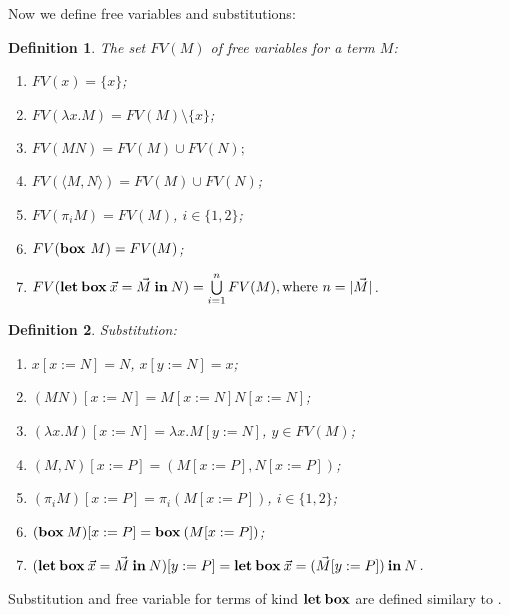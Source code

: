 \documentclass[a4paper]{article}
\newtheorem{defin}{Definition}
\begin{document}
  Now we define free variables and substitutions:

  \begin{defin} The set $FV(M)$ of free variables for a term $M$:

\begin{enumerate}
  \item $FV(x) = \{ x \}$;
  \item $FV(\lambda x. M) = FV(M) \setminus \{ x\}$;
  \item $FV(M N) = FV(M) \cup FV(N);$
  \item $FV(\langle M,N \rangle) = FV(M) \cup FV(N)$;
  \item $FV(\pi_i M) = FV(M)$, $i \in \{ 1, 2\}$;
  \item $FV(\text{\bf box } M) = FV(M)$;
  \item $FV({\bf let \: box} \: \vec{x} = \vec{M} {\: \bf in \:} N) = \bigcup \limits_{i = 1}^n FV(M), \text{where $n = |\vec{M}|$}$.
\end{enumerate}
  \end{defin}

  \begin{defin} Substitution:

\begin{enumerate}
  \item $x [x := N] = N$, $x [y := N] = x$;
  \item $(M N) [x := N] = M[x := N] N [x := N]$;
  \item $(\lambda x. M) [x := N] = \lambda x. M [y := N]$, $y \in FV(M)$;
  \item $(M, N)[x := P] = (M[x := P], N [x := P])$;
  \item $(\pi_i M) [x := P] = \pi_i (M[x := P])$, $i \in \{ 1, 2\}$;
  \item $({\bf box \: } M) [x := P] = {\bf box \: } (M [x := P])$;
  \item $({\bf let \: box \:}\vec{x} = \vec{M} {\: \bf in \:} N) [y := P] = {\bf let \: box \:} \vec{x} = (\vec{M} [y := P]) {\: \bf in \:} N$.
\end{enumerate}
  \end{defin}

Substitution and free variable for terms of kind ${\bf let \: box}$ are defined similary to \cite{ModalK}.
\end{document}
